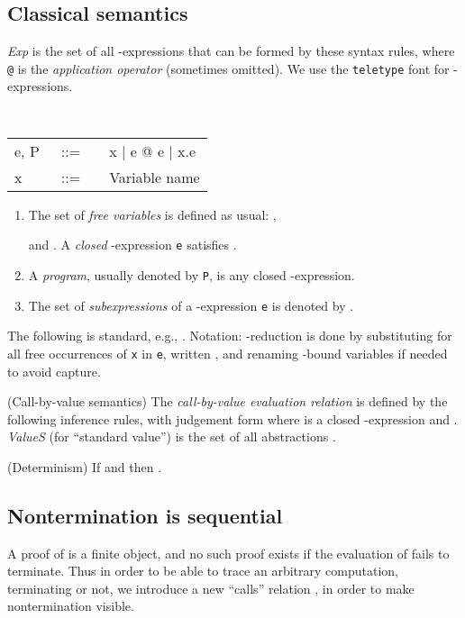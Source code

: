 \documentclass{LMCS}
\newcommand{\vair}{\relax}
\newcommand{\be}{\begin{enumerate}}
\newcommand{\ee}{\end{enumerate}}
\newcommand{\bt}{\begin{tabular}}
\newcommand{\et}{\end{tabular}}
\newcommand{\bdfn}{\begin{defi}}
\newcommand{\edfn}{\end{defi}}
\newcommand{\blem}{\begin{lem}}
\newcommand{\elem}{\end{lem}}
\theoremstyle{definition}\newtheorem{env}[thm]{Environment}
\begin{document}
\subsection{Classical semantics}
\label{classical-semantics}

\bdfn
\label{def-syntax}
  {\it Exp} is the set of all -expressions that can be 
formed by these syntax rules, where {\tt @} 
is the {\em application operator} (sometimes omitted). We 
 use the {\tt teletype} font for -expressions.
\vair

{\tt 
\bt{lcl}
e, P &\ ::=\ &\  x | e @ e | x.e\\
x &\ ::=\ &\  {\rm Variable name}
\et}
\be[]
\item 
The set of {\em free variables}  is defined as usual: , 
 
and 
.
 A {\it closed}  -expression {\tt e} satisfies 
.

\item
A {\em program}, usually 
denoted by {\tt P},  is any closed -expression. 

\item The set of {\em subexpressions} of a 
-expression {\tt e} is denoted by .
\ee
\edfn

The following is standard, e.g., \cite{plotkin}. Notation: 
-reduction is done by substituting 
 for all free occurrences of {\tt x} in {\tt e},
written
,  and renaming 
-bound variables if needed to avoid 
capture.

\bdfn \label{def-call-by-value-evaluation}
{\rm (Call-by-value semantics)}
The {\em call-by-value evaluation relation}  is defined by the 
following inference rules, with judgement form 
where  is a closed -expression and .
{\it ValueS} (for ``standard value'') is the set of all abstractions 
. \medskip


\edfn
\bigskip

\blem\label{lem-determinism}
{\rm(Determinism)} If  and   then .
\elem



\subsection{Nontermination is sequential} 
\label{sec-making-nontermination-visible}

A proof of  is a finite object, and no such proof
exists if the evaluation of  fails to terminate.  Thus in
order to be able to trace an arbitrary computation, terminating or
not, we introduce a new ``calls'' relation , in
order to make nontermination visible.\nobreak
\end{document}
